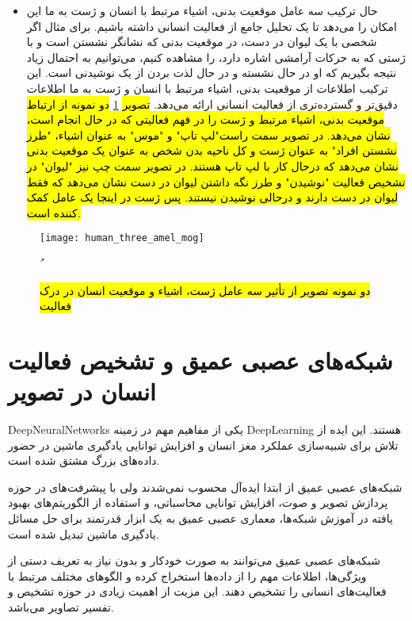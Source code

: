 \begin{itemize}
	\item
	حال ترکیب سه عامل موقعیت بدنی، اشیاء مرتبط با انسان و ژست به ما این امکان را می‌دهد تا یک تحلیل جامع از فعالیت انسانی داشته باشیم. برای مثال اگر شخصی با یک لیوان در دست، در موقعیت بدنی که نشانگر نشستن است و با ژستی که به حرکات آرامشی اشاره دارد، را مشاهده کنیم، می‌توانیم به احتمال زیاد نتیجه بگیریم که او در حال نشسته و در حال لذت بردن از یک نوشیدنی است. این ترکیب اطلاعات از موقعیت بدنی، اشیاء مرتبط با انسان و ژست به ما اطلاعات دقیق‌تر و گسترده‌تری از فعالیت انسانی ارائه می‌دهد. 
\hl{تصویر}
\ref{fig:human_three_amel_mog}
\hl{دو نمونه از ارتباط موقعیت بدنی، اشیاء مرتبط و ژست را در فهم فعالیتی که در حال انجام است، نشان می‌دهد. در تصویر سمت  راست"لپ تاپ" و "موس" به عنوان اشیاء، "طرز نشستن افراد" به عنوان ژست و کل ناحیه بدن شخص به عنوان یک موقعیت بدنی نشان می‌دهد که درحال کار با لپ تاپ هستند. در تصویر سمت چپ نیز "لیوان" در تشخیص فعالیت "نوشیدن" و طرز نگه داشتن لیوان در دست نشان می‌دهد که فقط لیوان در دست دارند و درحالی نوشیدن نیستند. پس ژست در اینجا یک عامل کمک کننده است.}
\end{itemize}
\vspace{8pt}
\begin{figure}[ht]
	\centerline{\texttt{[image: human\_three\_amel\_mog]}}
	\caption{
		\hl{دو نمونه تصویر از تأثیر سه عامل ژست، اشیاء و موقعیت انسان در درک فعالیت}
		\cite{tasvirSevomChapterYek}
	}ُ
	\label{fig:human_three_amel_mog}
\end{figure}
\vspace{20pt}

\section{شبکه‌های عصبی عمیق و تشخیص فعالیت انسان در تصویر}

\gls{DeepNeuralNetworks}
 یکی از مفاهیم مهم در زمینه %
\gls{DeepLearning}
  هستند. این ایده از تلاش برای شبیه‌سازی عملکرد مغز انسان و افزایش توانایی یادگیری ماشین در حضور داده‌های بزرگ مشتق شده است.

شبکه‌های عصبی عمیق از ابتدا ایده‌آل محسوب نمی‌شدند ولی با پیشرفت‌های در حوزه پردازش تصویر و صوت، افزایش توانایی محاسباتی، و استفاده از الگوریتم‌های بهبود یافته در آموزش شبکه‌ها، معماری عصبی عمیق به یک ابزار قدرتمند برای حل مسائل یادگیری ماشین تبدیل شده است.

شبکه‌های عصبی عمیق می‌توانند به صورت خودکار و بدون نیاز به تعریف دستی از ویژگی‌ها، اطلاعات مهم را از داده‌ها استخراج کرده و الگوهای مختلف مرتبط با فعالیت‌های انسانی را تشخیص دهند. این مزیت از اهمیت زیادی در حوزه تشخیص و تفسیر تصاویر می‌باشد.

